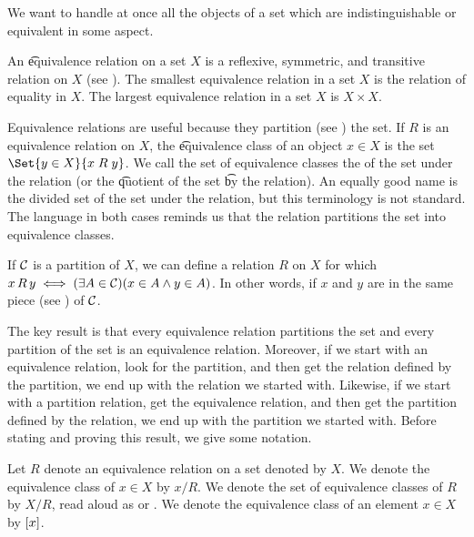 

We want to handle at once all the objects of a set which are indistinguishable or equivalent in some aspect.


An \t{equivalence relation} on a set $X$ is a reflexive, symmetric, and transitive relation on $X$ (see ).
The smallest equivalence relation in a set $X$ is the relation of equality in $X$.
The largest equivalence relation in a set $X$ is $X \times X$.

Equivalence relations are useful because they partition (see ) the set.
If $R$ is an equivalence relation on $X$, the \t{equivalence class} of an object $x \in X$ is the set $\Set{y \in X}{x\;R\;y}$.
We call the set of equivalence classes the  of the set under the relation (or the \t{quotient} of the set \t{by the relation}).
An equally good name is the divided set of the set under the relation, but this terminology is not standard.
The language in both cases reminds us that the relation partitions the set into equivalence classes.

If $\mathcal{C}$ is a partition of $X$, we can define a relation $R$ on $X$ for which $x\,R\,y \iff (\exists A \in \mathcal{C})(x \in A \land y \in A)$.
In other words, if $x$ and $y$ are in the same piece (see ) of $\mathcal{C}$.

The key result is that every equivalence relation partitions the set and every partition of the set is an equivalence relation.
Moreover, if we start with an equivalence relation, look for the partition, and then get the relation defined by the partition, we end up with the relation we started with.
Likewise, if we start with a partition relation, get the equivalence relation, and then get the partition defined by the relation, we end up with the partition we started with.
Before stating and proving this result, we give some notation.


Let $R$ denote an equivalence relation on a set denoted by $X$.
We denote the equivalence class of $x \in X$ by $x / R$.
We denote the set of equivalence classes of $R$ by $X/R$, read aloud as  or .
We denote the equivalence class of an element $x \in X$ by $[x]$.

